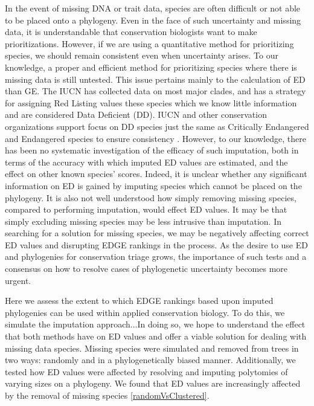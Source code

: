 \documentclass[12pt,english]{article}
\begin{document}
In the event of missing DNA or trait data, species are often difficult or not
able to be placed onto a phylogeny. Even in the face of such uncertainty and
missing data, it is understandable that conservation biologists want to make
prioritizations. However, if we are using a quantitative method for prioritizing
species, we should remain consistent even when uncertainty arises. To our
knowledge, a proper and efficient method for prioritizing species where there is
missing data is still untested. This issue pertains mainly to the calculation of
ED than GE. The IUCN has collected data on most major clades, and has a strategy
for assigning Red Listing values these species which we know little information
and are considered Data Deficient (DD). IUCN and other conservation
organizations support focus on DD species just the same as Critically Endangered
and Endangered species to ensure consistency \autocite{Rodrigues2006}. However,
to our knowledge, there has been no systematic investigation of the efficacy of
such imputation, both in terms of the accuracy with which imputed ED values are
estimated, and the effect on other known species' scores. Indeed, it is unclear
whether any significant information on ED is gained by imputing species which
cannot be placed on the phylogeny. It is also not well understood how simply
removing missing species, compared to performing imputation, would effect ED
values. It may be that simply excluding missing species may be less intrusive
than imputation. In searching for a solution for missing species, we may be
negatively affecting correct ED values and disrupting EDGE rankings in the
process. As the desire to use ED and phylogenies for conservation triage grows,
the importance of such tests and a consensus on how to resolve cases of
phylogenetic uncertainty becomes more urgent.

Here we assess the extent to which EDGE rankings based upon imputed phylogenies
can be used within applied conservation biology. To do this, we simulate the
imputation approach...In doing so, we hope to understand the effect that both
methods have on ED values and offer a viable solution for dealing with missing
data species. Missing species were simulated and removed from trees in two ways:
randomly and in a phylogenetically biased manner. Additionally, we tested how ED
values were affected by resolving and imputing polytomies of varying sizes on a
phylogeny. We found that ED values are increasingly affected by the removal of
missing species \ref{randomVsClustered}. 
\end{document}
